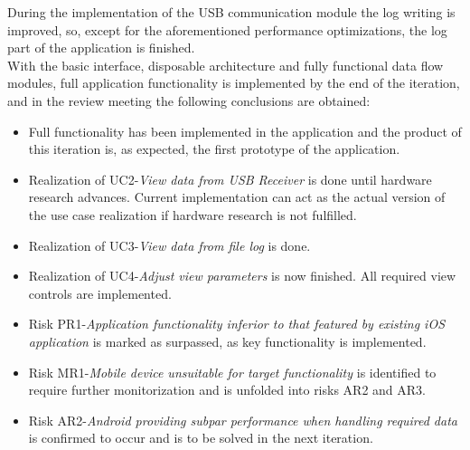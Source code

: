 			During the implementation of the USB communication module the log writing is improved, so, except for the aforementioned performance optimizations, the log part of the application is finished.\\

			With the basic interface, disposable architecture and fully functional data flow modules, full application functionality is implemented by the end of the iteration, and in the review meeting the following conclusions are obtained:
			\begin{itemize}
				\item Full functionality has been implemented in the application and the product of this iteration is, as expected, the first prototype of the application.
				\item Realization of UC2-\emph{View data from USB Receiver} is done until hardware research advances. Current implementation can act as the actual version of the use case realization if hardware research is not fulfilled.

				\item Realization of UC3-\emph{View data from file log} is done.
				
				\item Realization of UC4-\emph{Adjust view parameters} is now finished. All required view controls are implemented.

				\item Risk PR1-\emph{Application functionality inferior to that featured by existing iOS application} is marked as surpassed, as key functionality is implemented.
				\item Risk MR1-\emph{Mobile device unsuitable for target functionality} is identified to require further monitorization and is unfolded into risks AR2 and AR3.
				\item Risk AR2-\emph{Android providing subpar performance when handling required data} is confirmed to occur and is to be solved in the next iteration.
			\end{itemize}


